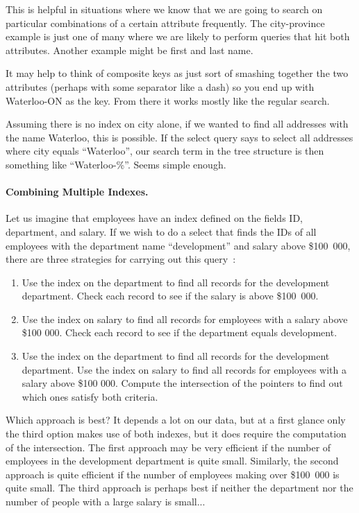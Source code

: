 This is helpful in situations where we know that we are going to search on particular combinations of a certain attribute frequently. The city-province example is just one of many where we are likely to perform queries that hit both attributes. Another example might be first and last name.

It may help to think of composite keys as just sort of smashing together the two attributes (perhaps with some separator like a dash) so you end up with Waterloo-ON as the key. From there it works mostly like the regular search. 

Assuming there is no index on city alone, if we wanted to find all addresses with the name Waterloo, this is possible. If the select query says to select all addresses where city equals ``Waterloo'', our search term in the tree structure is then something like ``Waterloo-\%''. Seems simple enough. 


\paragraph{Combining Multiple Indexes.} Let us imagine that employees have an index defined on the fields ID, department, and salary. If we wish to do a select that finds the IDs of all employees with the department name ``development'' and salary above \$100~000, there are three strategies for carrying out this query~\cite{dsc}:

\begin{enumerate}
	\item Use the index on the department to find all records for the development department. Check each record to see if the salary is above \$100~000.
	\item Use the index on salary to find all records for employees with a salary above \$100 000. Check each record to see if the department equals development.
	\item Use the index on the department to find all records for the development department. Use the index on salary to find all records for employees with a salary above \$100 000. Compute the intersection of the pointers to find out which ones satisfy both criteria.
\end{enumerate}

Which approach is best? It depends a lot on our data, but at a first glance only the third option makes use of both indexes, but it does require the computation of the intersection. The first approach may be very efficient if the number of employees in the development department is quite small. Similarly, the second approach is quite efficient if the number of employees making over \$100~000 is quite small. The third approach is perhaps best if neither the department nor the number of people with a large salary is small...

